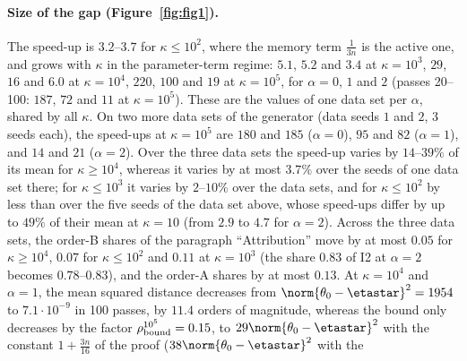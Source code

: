 \paragraph{Size of the gap (Figure~\ref{fig:fig1}).}
The speed-up is $3.2$--$3.7$ for $\kappa\le10^2$, where the memory term $\frac1{3n}$ is the active one, and grows with
$\kappa$ in the parameter-term regime: $5.1$, $5.2$ and $3.4$ at $\kappa=10^3$, $29$, $16$ and $6.0$ at $\kappa=10^4$, $220$,
$100$ and $19$ at $\kappa=10^5$, for $\alpha=0$, $1$ and $2$ (passes 20--100: $187$, $72$ and $11$ at $\kappa=10^5$).
These are the values of one data set per $\alpha$, shared by all $\kappa$. On two more data sets of the generator (data
seeds $1$ and $2$, 3 seeds each), the speed-ups at $\kappa=10^5$ are $180$ and $185$ ($\alpha=0$), $95$ and $82$
($\alpha=1$), and $14$ and $21$ ($\alpha=2$). Over the three data sets the speed-up varies by $14$--$39\%$ of its mean for
$\kappa\ge10^4$, whereas it varies by at most $3.7\%$ over the seeds of one data set there; for $\kappa\le10^3$ it varies
by $2$--$10\%$ over the data sets, and for $\kappa\le10^2$ by less than over the five seeds of the data set above, whose
speed-ups differ by up to $49\%$ of their mean at $\kappa=10$ (from $2.9$ to $4.7$ for $\alpha=2$). Across the three data
sets, the order-B shares of the paragraph ``Attribution'' move by at most $0.05$ for $\kappa\ge10^4$, $0.07$ for
$\kappa\le10^2$ and $0.11$ at $\kappa=10^3$ (the share $0.83$ of I2 at $\alpha=2$ becomes $0.78$--$0.83$), and the
order-A shares by at most $0.13$. At
$\kappa=10^4$ and $\alpha=1$, the mean squared distance decreases from $\norm{\theta_0-\etastar}^2=1954$ to $7.1\cdot10^{-9}$
in 100 passes, by $11.4$ orders of magnitude, whereas the bound only decreases by the factor $\rho_{\rm bound}^{10^5}=0.15$,
to $29\norm{\theta_0-\etastar}^2$ with the constant $1+\frac{3n}{16}$ of the proof ($38\norm{\theta_0-\etastar}^2$ with the
